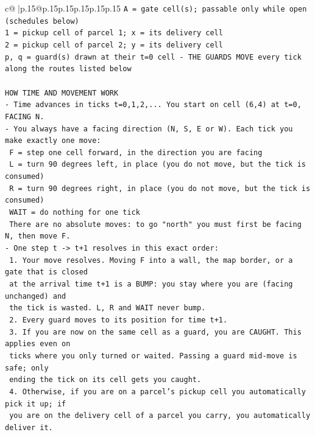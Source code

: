 \documentclass{article}
\begin{document}
{\begin{supertabular}{c@{$\;$}|p{.15\linewidth}@{}p{.15\linewidth}p{.15\linewidth}p{.15\linewidth}p{.15\linewidth}p{.15\linewidth}}
{{{\texttt{A = gate cell(s); passable only while open (schedules below)} \\
\texttt{1 = pickup cell of parcel 1; x = its delivery cell} \\
\texttt{2 = pickup cell of parcel 2; y = its delivery cell} \\
\texttt{p, q = guard(s) drawn at their t=0 cell {-} THE GUARDS MOVE every tick along the routes listed below} \\
\\ 
\texttt{HOW TIME AND MOVEMENT WORK} \\
\texttt{{-} Time advances in ticks t=0,1,2,... You start on cell (6,4) at t=0, FACING N.} \\
\texttt{{-} You always have a facing direction (N, S, E or W). Each tick you make exactly one move:} \\
\texttt{  F    = step one cell forward, in the direction you are facing} \\
\texttt{  L    = turn 90 degrees left, in place (you do not move, but the tick is consumed)} \\
\texttt{  R    = turn 90 degrees right, in place (you do not move, but the tick is consumed)} \\
\texttt{  WAIT = do nothing for one tick} \\
\texttt{  There are no absolute moves: to go "north" you must first be facing N, then move F.} \\
\texttt{{-} One step t {-}> t+1 resolves in this exact order:} \\
\texttt{  1. Your move resolves. Moving F into a wall, the map border, or a gate that is closed} \\
\texttt{     at the arrival time t+1 is a BUMP: you stay where you are (facing unchanged) and} \\
\texttt{     the tick is wasted. L, R and WAIT never bump.} \\
\texttt{  2. Every guard moves to its position for time t+1.} \\
\texttt{  3. If you are now on the same cell as a guard, you are CAUGHT. This applies even on} \\
\texttt{     ticks where you only turned or waited. Passing a guard mid{-}move is safe; only} \\
\texttt{     ending the tick on its cell gets you caught.} \\
\texttt{  4. Otherwise, if you are on a parcel's pickup cell you automatically pick it up; if} \\
\texttt{     you are on the delivery cell of a parcel you carry, you automatically deliver it.} \\
}}}
\end{supertabular}}
\end{document}
